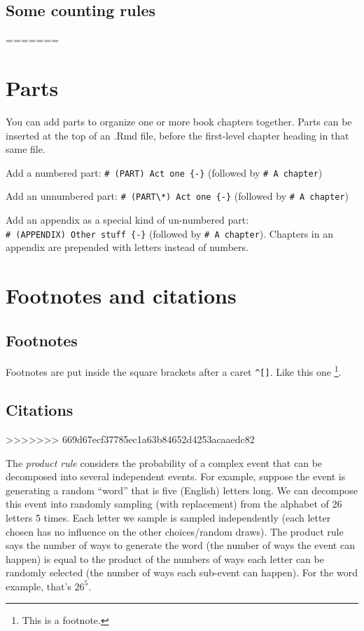 \documentclass[]{book}
\begin{document}
\section{Some counting rules}\label{some-counting-rules}
=======
\chapter{Parts}\label{parts}

You can add parts to organize one or more book chapters together. Parts
can be inserted at the top of an .Rmd file, before the first-level
chapter heading in that same file.

Add a numbered part: \texttt{\#\ (PART)\ Act\ one\ \{-\}} (followed by
\texttt{\#\ A\ chapter})

Add an unnumbered part:
\texttt{\#\ (PART\textbackslash{}*)\ Act\ one\ \{-\}} (followed by
\texttt{\#\ A\ chapter})

Add an appendix as a special kind of un-numbered part:
\texttt{\#\ (APPENDIX)\ Other\ stuff\ \{-\}} (followed by
\texttt{\#\ A\ chapter}). Chapters in an appendix are prepended with
letters instead of numbers.

\chapter{Footnotes and citations}\label{footnotes-and-citations}

\section{Footnotes}\label{footnotes}

Footnotes are put inside the square brackets after a caret
\texttt{\^{}{[}{]}}. Like this one \footnote{This is a footnote.}.

\section{Citations}\label{citations}
>>>>>>> 669d67ecf37785ec1a63b84652d4253acaaedc82

The \emph{product rule} considers the probability of a complex event
that can be decomposed into several independent events. For example,
suppose the event is generating a random ``word'' that is five (English)
letters long. We can decompose this event into randomly sampling (with
replacement) from the alphabet of 26 letters 5 times. Each letter we
sample is sampled independently (each letter chosen has no influence on
the other choices/random draws). The product rule says the number of
ways to generate the word (the number of ways the event can happen) is
equal to the product of the numbers of ways each letter can be randomly
selected (the number of ways each sub-event can happen). For the word
example, that's \(26^5\).
\end{document}

